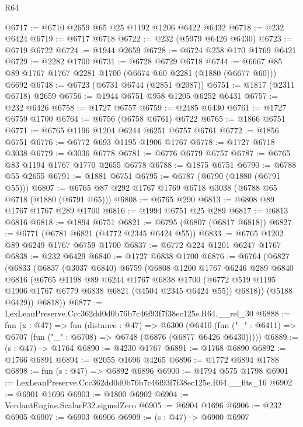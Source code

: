 \begin{lexlean}{R64}
\begin{coremodule}
@6717 := @6710 @2659 @65 @25 @1192 @1206 @6422 @6432
@6718 := @232 @6424
@6719 := @6717 @6718
@6722 := @232 (@5979 @6426 @6430)
@6723 := @6719 @6722
@6724 := @1944 @2659
@6728 := @6724 @258 @170 @1769 @6421
@6729 := @2282 @1700
@6731 := @6728 @6729 @6718
@6744 := @6667 @85 @89 @1767 @1767 @2281 @1700 (@6674 @60 @2281 (@1880 (@6677 @60))) @6692
@6748 := @6723 (@6731 @6744 (@2851 @2087))
@6751 := @1817 (@2311 @6718) @2659
@6756 := @1944 @6751 @958 @1205 @6252 @6431
@6757 := @232 @6426
@6758 := @1727 @6757
@6759 := @2485 @6430
@6761 := @1727 @6759 @1700
@6764 := @6756 (@6758 @6761) @6722
@6765 := @1866 @6751
@6771 := @6765 @1196 @1204 @6244 @6251 @6757 @6761
@6772 := @1856 @6751
@6776 := @6772 @693 @1195 @1906 @1767
@6778 := @1727 @6718 @3038
@6779 := @3036 @6778
@6781 := @6776 @6779 @6757
@6787 := @6765 @83 @1194 @1767 @1770 @2655 @6778
@6788 := @1875 @6751
@6790 := @6788 @55 @2655
@6791 := @1881 @6751
@6795 := @6787 (@6790 (@1880 (@6791 @55)))
@6807 := @6765 @87 @292 @1767 @1769 @6718 @3038 (@6788 @65 @6718 (@1880 (@6791 @65)))
@6808 := @6765 @290
@6813 := @6808 @89 @1767 @1767 @289 @1700
@6816 := @1994 @6751 @25 @289
@6817 := @6813 @6816
@6818 := @1894 @6751
@6821 := @6795 (@6807 (@6817 @6818))
@6827 := @6771 (@6781 @6821 (@4772 @2345 @6424 @55))
@6833 := @6765 @1202 @89 @6249 @1767 @6759 @1700
@6837 := @6772 @224 @1201 @6247 @1767
@6838 := @232 @6429
@6840 := @1727 @6838 @1700
@6876 := @6764
    (@6827
      (@6833
        (@6837
          (@3037 @6840)
          @6759
          (@6808
            @1200
            @1767
            @6246
            @289
            @6840
            @6816
            (@6765
              @1198
              @89
              @6244
              @1767
              @6838
              @1700
              (@6772 @519 @1195 @1906 @1767 @6779 @6838 @6821 (@4504 @2345 @6424 @55))
              @6818))
          (@5188 @6429))
        @6818))
@6877 := LexLeanPreserve.Ccc362dd0d0b76b7c46f93f7f38ec125e.R64.__rel_30
@6888 := fun (x : @47) =>
  fun (distance : @47) =>
  @6300
    (@6410 (fun ("_" : @6411) => @6707 (fun ("_" : @6708) => @6748 (@6876 (@6877 @6426 @6430)))))
@6889 := (s : @47) -> @1764
@6890 := @4230 @1767
@6891 := @1768 @6890
@6892 := @1766 @6891
@6894 := @2055 @1696 @4265
@6896 := @1772 @6894 @1788
@6898 := fun (s : @47) => @6892 @6896
@6900 := @1794 @575 @1798
@6901 := LexLeanPreserve.Ccc362dd0d0b76b7c46f93f7f38ec125e.R64.__fits_16
@6902 := @6901 @1696
@6903 := @1800 @6902
@6904 := VerdantEngine.ScalarF32.signedZero
@6905 := @6904 @1696
@6906 := @232 @6905
@6907 := @6903 @6906
@6909 := (s : @47) -> @6900 @6907

\end{coremodule}
\end{lexlean}
